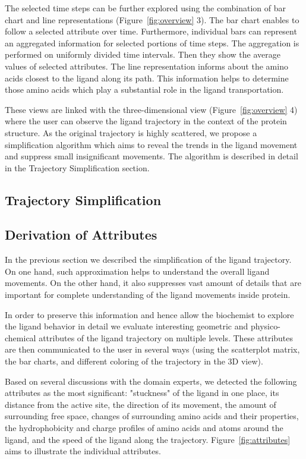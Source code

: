\documentclass[twocolumn]{bmcart}%
\begin{document}
The selected time steps can be further explored using the combination of bar chart and line representations (Figure~\ref{fig:overview} 3). 
The bar chart enables to follow a selected attribute over time.
Furthermore, individual bars can represent an aggregated information for selected portions of time steps.
The aggregation is performed on uniformly divided time intervals.
Then they show the average values of selected attributes.
The line representation informs about the amino acids closest to the ligand along its path.
This information helps to determine those amino acids which play a substantial role in the ligand transportation.

These views are linked with the three-dimensional view (Figure~\ref{fig:overview} 4) where the user can observe the ligand trajectory in the context of the protein structure.
As the original trajectory is highly scattered, we propose a simplification algorithm which aims to reveal the trends in the ligand movement and suppress small insignificant movements.
The algorithm is described in detail in the Trajectory Simplification section.


\subsection*{Trajectory Simplification}


\subsection*{Derivation of Attributes}
In the previous section we described the simplification of the ligand trajectory. 
On one hand, such approximation helps to understand the overall ligand movements. 
On the other hand, it also suppresses vast amount of details that are important for complete understanding of the ligand movements inside protein.

In order to preserve this information and hence allow the biochemist to explore the ligand behavior in detail we evaluate interesting geometric and physico-chemical attributes of the ligand trajectory on multiple levels. 
These attributes are then communicated to the user in several ways (using the scatterplot matrix, the bar charts, and different coloring of the trajectory in the 3D view).

Based on several discussions with the domain experts, we detected the following attributes as the most significant: "stuckness" of the ligand in one place, its distance from the active site, the direction of its movement, the amount of surrounding free space, changes of surrounding amino acids and their properties, the hydrophobicity and charge profiles of amino acids and atoms around the ligand, and the speed of the ligand along the trajectory. 
Figure~\ref{fig:attributes} aims to illustrate the individual attributes.
\end{document}
